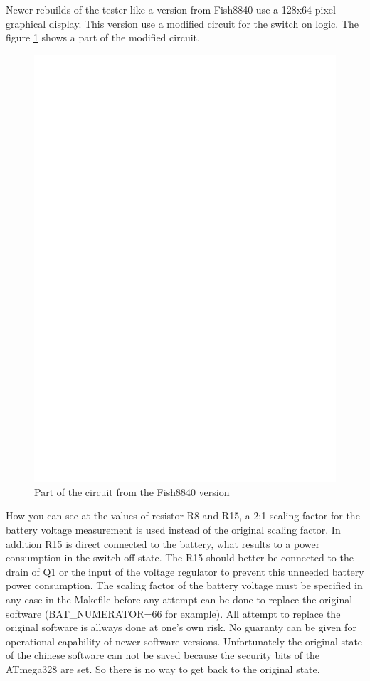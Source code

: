Newer rebuilds of the tester like a version from Fish8840  use a 128x64 pixel graphical display.
This version use a modified circuit for the switch on logic. 
The figure \ref{fig:Fish8840} shows a part of the modified circuit.

\begin{figure}[H]
\centering
\includegraphics[width=12cm]{../FIG/Fish8840.eps}
\caption{Part of the circuit from the Fish8840 version}
\label{fig:Fish8840}
\end{figure}

How you can see at the values of resistor R8 and R15,
a 2:1 scaling factor for the battery voltage measurement is used instead of the original scaling factor.
In addition R15 is direct connected to the battery, what results to a power consumption in the switch off state.
The R15 should better be connected to the drain of Q1 or the input of the voltage regulator to prevent this
unneeded battery power consumption.
The scaling factor of the battery voltage must be specified in any case in the Makefile before any
attempt can be done to replace the original software (BAT\_NUMERATOR=66 for example).
All attempt to replace the original software is allways done at one's own risk.
No guaranty can be given for operational capability of newer software versions.
Unfortunately the original state of the chinese software can not be saved because the 
security bits of the ATmega328 are set. So there is no way to get back to the original state.

